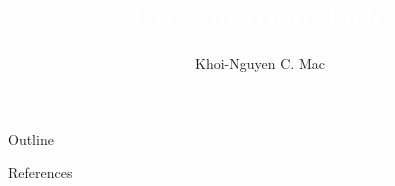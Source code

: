 \documentclass[aspectratio=169]{beamer}
\title[Presentation]{
    \textcolor{white}{\textbf{Presentation Title}}
}
\author[Mac \etal]{Khoi-Nguyen C. Mac}
\date{}
\begin{document}
    \frame{\titlepage}
	
    \begin{frame}{Outline}
        \tableofcontents
    \end{frame}
	
    
    
    \nocite{item}
    \begin{frame}[t, allowframebreaks]{References}
        \small
        
        
    \end{frame}
\end{document}
